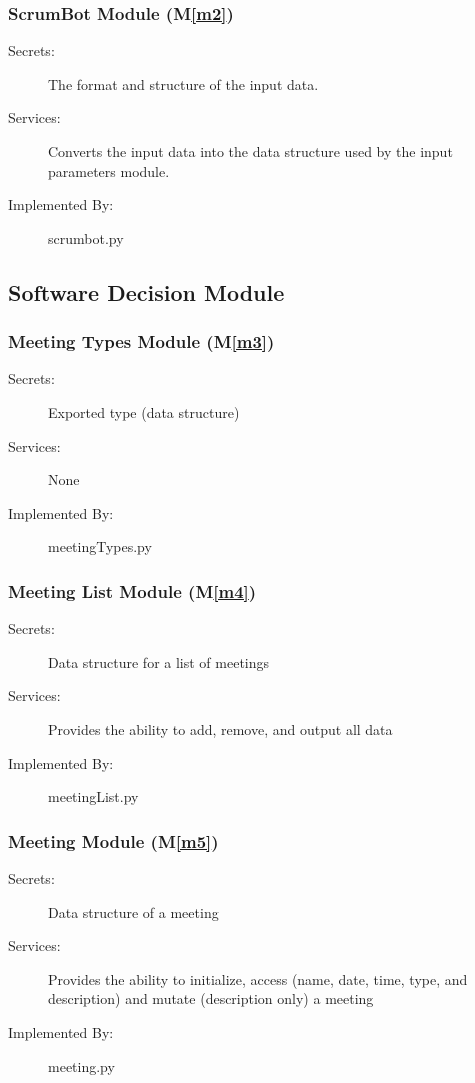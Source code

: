 \documentclass[12pt, titlepage]{article}
\newcommand{\mref}[1]{M\ref{#1}}
\begin{document}
\subsubsection{ScrumBot Module (\mref{m2})}
\begin{description}
    \item[Secrets:] The format and structure of the input data.
    \item[Services:] Converts the input data into the data structure used by the input parameters module.
    \item[Implemented By:] scrumbot.py
\end{description}

\subsection{Software Decision Module}
\subsubsection{Meeting Types Module (\mref{m3})}
\begin{description}
    \item[Secrets:] Exported type (data structure)
    \item[Services:] None
    \item[Implemented By:] meetingTypes.py
\end{description}

\subsubsection{Meeting List Module (\mref{m4})}
\begin{description}
    \item[Secrets:] Data structure for a list of meetings
    \item[Services:] Provides the ability to add, remove, and output all data
    \item[Implemented By:] meetingList.py
\end{description}

\subsubsection{Meeting Module (\mref{m5})}
\begin{description}
    \item[Secrets:] Data structure of a meeting
    \item[Services:] Provides the ability to initialize, access (name, date, time, type, and description) and mutate (description only) a meeting
    \item[Implemented By:] meeting.py
\end{description}
\end{document}
